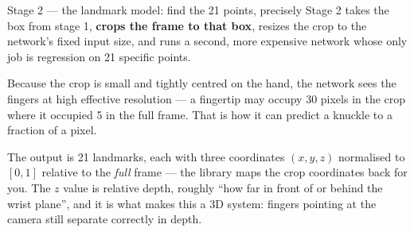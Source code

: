 \begin{mlconcept}{Stage 2 --- the landmark model: find the 21 points, precisely}
Stage 2 takes the box from stage 1, \textbf{crops the frame to that box}, resizes the crop to the
network's fixed input size, and runs a second, more expensive network whose only job is regression on
21 specific points.

Because the crop is small and tightly centred on the hand, the network sees the fingers at high
effective resolution --- a fingertip may occupy 30 pixels in the crop where it occupied 5 in the full
frame. That is how it can predict a knuckle to a fraction of a pixel.

The output is 21 landmarks, each with three coordinates $(x, y, z)$ normalised to $[0, 1]$ relative
to the \emph{full} frame --- the library maps the crop coordinates back for you. The $z$ value is
relative depth, roughly ``how far in front of or behind the wrist plane'', and it is what makes this
a 3D system: fingers pointing at the camera still separate correctly in depth.
\end{mlconcept}

